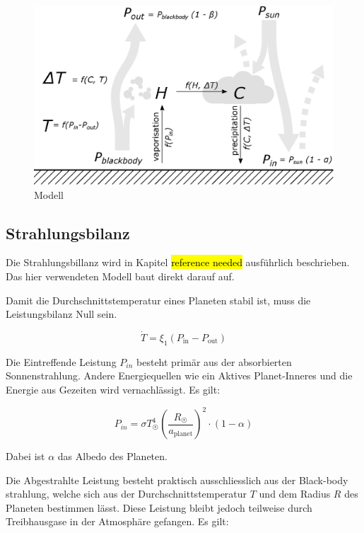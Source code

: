 \begin{refsection}
\begin{figure}
	\centering
	\includegraphics[width=\textwidth]{planeten/Pictures/Model.eps}
	\caption{Modell}
\end{figure}

\subsection{Strahlungsbilanz}

Die Strahlungsbillanz wird in Kapitel \hl{reference needed} ausführlich beschrieben. Das hier verwendeten Modell baut direkt darauf auf.

Damit die Durchschnittstemperatur eines Planeten stabil ist, muss die Leistungsbilanz Null sein.

\begin{equation}
\dot{T} = \xi_1(P_{\text{in}} - P_{\text{out}})
\end{equation}

Die Eintreffende Leistung $P_{in}$ besteht primär aus der absorbierten Sonnenstrahlung. Andere Energiequellen wie ein Aktives Planet-Inneres und die Energie aus Gezeiten wird vernachlässigt. Es gilt:

\begin{equation}
P_{in} = \sigma T_{\astrosun}^4 \left( \frac{R_{\astrosun}}{a_{\text{planet}}} \right) ^2 \cdot (1-\alpha)
\end{equation}

Dabei ist $\alpha$ das Albedo des Planeten.

Die Abgestrahlte Leistung besteht praktisch ausschliesslich aus der Black-body strahlung, welche sich aus der Durchschnittstemperatur $T$ und dem Radius $R$ des Planeten bestimmen lässt. Diese Leistung bleibt jedoch teilweise durch Treibhausgase in der Atmosphäre gefangen. Es gilt: 


\end{refsection}
